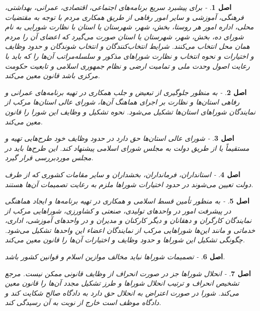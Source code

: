 \documentclass[12pt]{article}
\newtheorem{asl}{اصل}
\begin{document}
\begin{asl}- 
برای پیشبرد سریع برنامه‏‌های اجتماعی، اقتصادی، عمرانی، بهداشتی، فرهنگی، آموزشی و سایر امور رفاهی از طریق همکاری مردم با توجه به مقتضیات محلی، اداره امور هر روستا، بخش، شهر، شهرستان یا استان با نظارت شورایی به نام شورای ده، بخش، شهر، شهرستان یا استان صورت می‌گیرد که اعضای آن را مردم همان محل انتخاب می‌کنند. شرایط انتخاب‏‌کنندگان و انتخاب شوندگان و حدود وظایف و اختیارات و نحوه انتخاب و نظارت شوراهای مذکور و سلسله‌مراتب آن‌ها را که باید با رعایت اصول وحدت ملی و تمامیت ارضی و نظام جمهوری اسلامی و تابعیت حکومت مرکزی باشد قانون معین می‌کند.  
\end{asl}

\begin{asl}- 
به منظور جلوگیری از تبعیض و جلب همکاری در تهیه برنامه‏‌های عمرانی و رفاهی استان‌ها و نظارت بر اجرای هماهنگ آن‌ها، شورای عالی استان‌ها مرکب از نمایندگان شوراهای استان‌ها تشکیل می‌شود. نحوه تشکیل و وظایف این شورا را قانون معین می‌کند. 
\end{asl}

\begin{asl}- 
شورای عالی استان‌ها حق دارد در حدود وظایف خود طرح‌هایی تهیه و مستقیماً یا از طریق دولت به مجلس شورای اسلامی پیشنهاد کند. این طرح‌ها باید در مجلس موردبررسی قرار گیرد. 
\end{asl}

\begin{asl}- 
استانداران، فرمانداران، بخشداران و سایر مقامات کشوری که از طرف دولت تعیین می‌شوند در حدود اختیارات شوراها ملزم به رعایت تصمیمات آن‌ها هستند. 
\end{asl}

\begin{asl}- 
به منظور تأمین قسط اسلامی و همکاری در تهیه برنامه‌‏ها و ایجاد هماهنگی در پیشرفت امور در واحدهای تولیدی، صنعتی و کشاورزی، شوراهایی مرکب از نمایندگان کارگران و دهقانان و دیگر کارکنان و مدیران و در واحدهای آموزشی، اداری، خدماتی و مانند این‌ها شوراهایی مرکب از نمایندگان اعضاء این واحدها تشکیل می‌شود. چگونگی تشکیل این شوراها و حدود وظایف و اختیارات آن‌ها را قانون معین می‌کند. 
\end{asl}

\begin{asl}- 
تصمیمات شوراها نباید مخالف موازین اسلام و قوانین کشور باشد. 
\end{asl}

\begin{asl}- 
انحلال شوراها جز در صورت انحراف از وظایف قانونی ممکن نیست. مرجع تشخیص انحراف و ترتیب انحلال شوراها و طرز تشکیل مجدد آن‌ها را قانون معین می‌کند. شورا در صورت اعتراض به انحلال حق دارد به دادگاه صالح شکایت کند و دادگاه موظف است خارج از نوبت به آن رسیدگی کند. 
\end{asl}
\end{document}
